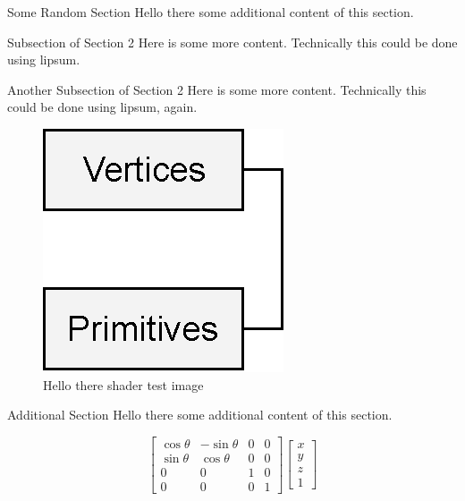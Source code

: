 \documentclass[10pt]{article}
\begin{document}
\begin{section}{Some Random Section}
	Hello there some additional content of this section.
	
	\begin{subsection}{Subsection of Section 2}
		Here is some more content. Technically this could be done using lipsum.
	\end{subsection}
	
	\begin{subsection}{Another Subsection of Section 2}
		Here is some more content. Technically this could be done using lipsum, again.
	\end{subsection}
	
	\begin{figure}
		\includegraphics{images/ShaderTest.eps}
		\caption{Hello there shader test image}
		\label{fig:shadertest}
	\end{figure}
\end{section}

\begin{section}{Additional Section}
	Hello there some additional content of this section.
	
	\begin{equation}
		\begin{bmatrix}
			\cos{\theta} & -\sin{\theta} & 0 & 0 \\
			\sin{\theta} & \cos{\theta} & 0 & 0 \\
			0 & 0 & 1 & 0 \\
			0 & 0 & 0 & 1
		\end{bmatrix}
		\begin{bmatrix}
			x \\
			y \\
			z \\
			1
		\end{bmatrix}
	\end{equation}
\end{section}
	
\end{document}
